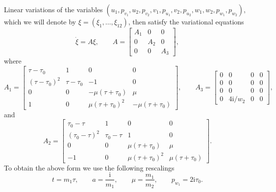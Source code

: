 Linear variations of the variables
$(u_1, p_{v_1},u_2,p_{v_2},v_1,p_{u_1},v_2,p_{u_2},w_1, w_2,
p_{w_1},p_{w_2})$, which we will denote by $\xi=(\xi_1, \ldots, \xi_{12})$, then
satisfy the variational equations
\begin{equation}
 \label{eq:varg}
 \dot \xi = A\xi, \qquad A = \begin{bmatrix}
 A_1 & 0 & 0\\
 0 & A_2 & 0\\
 0 & 0 & A_3
 \end{bmatrix}\!,
\end{equation}
where
\begin{equation*}
 A_1 = \begin{bmatrix}
 \tau -\tau_0& 1 & 0 & 0\\
 (\tau-\tau_0)^2 & \tau-\tau_0 & -1 & 0\\
 0 & 0 & -\mu(\tau+\tau_0) & \mu \\
 1 & 0 & \mu(\tau+\tau_0)^2 & -\mu(\tau+\tau_0)
 \end{bmatrix}\!,\qquad
 A_3 = \begin{bmatrix}
 0 & 0 & 0 & 0\\
 0 & 0 & 0 & 0\\
 0 & 0 & 0 & 0 \\
 0 & 4\mathrm{i}/w_2 & 0 & 0
 \end{bmatrix}\!,
\end{equation*}
and
\begin{equation*}
 A_2 = \begin{bmatrix}
 \tau_0-\tau & 1 & 0 & 0\\
 (\tau_0-\tau)^2 & \tau_0-\tau & 1 & 0\\
 0 & 0 & \mu(\tau+\tau_0) & \mu \\
 -1 & 0 & \mu(\tau+\tau_0)^2 & \mu(\tau+\tau_0)
 \end{bmatrix}\!.
\end{equation*}
To obtain the above form we use the following rescalings
\begin{equation*}
 t = m_1\tau,\qquad
 a = \frac{\mathrm{i}}{m_1},\qquad
 \mu = \frac{m_1}{m_2}, \qquad
 p_{w_1}=2 \mathrm{i} \tau_0.
\end{equation*}

